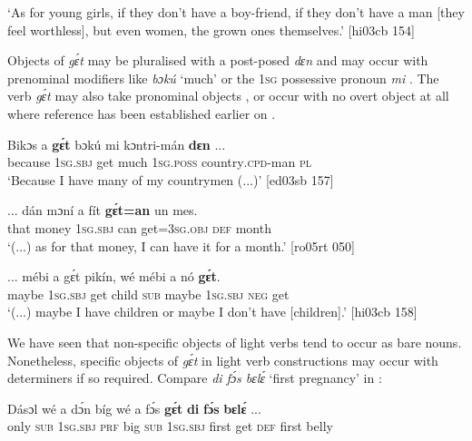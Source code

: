 \glt ‘As for young girls, if they don’t have a boy-friend, if they don’t have a man
[they feel worthless], but even women, the grown ones themselves.’ [hi03cb 154]
\z

Objects of \textit{gɛ́t} may be pluralised with a post-posed \textit{dɛn}  and may occur with prenominal modifiers like \textit{bɔkú} ‘much’ or the \textsc{1sg} possessive pronoun \textit{mi} . The verb \textit{gɛ́t} may also take pronominal objects , or occur with no overt object at all where reference has been established earlier on .


\ea%
    \label{ex:key:1160}
    \gll Bikɔs  a    \textbf{gɛ́t}  bɔkú  mi    kɔntri-mán    \textbf{dɛn}  \op...\cp{}\\
because  \textsc{1sg.sbj}  get  much  \textsc{1sg.poss}  country\textsc{.cpd}{}-man  \textsc{pl}\\

\glt ‘Because I have many of my countrymen (...)’ [ed03sb 157]
\z


\ea%
    \label{ex:key:1161}
    \gll \op...\cp{}  dán  mɔní  a    fít  \textbf{gɛ́t=an}    un  mes.\\
  {} that  money  \textsc{1sg.sbj}  can  get=\textsc{3sg.obj}  \textsc{def}  month\\

\glt ‘(...) as for that money, I can have it for a month.’ [ro05rt 050]
\z


\ea%
    \label{ex:key:1162}
    \gll \op...\cp{}  mébi  a    gɛ́t  pikín,  wé  mébi  a    nó  \textbf{gɛ́t}.\\
  {} maybe  \textsc{1sg.sbj}  get  child  \textsc{sub}  maybe  \textsc{1sg.sbj}  \textsc{neg}  get\\

\glt ‘(...) maybe I have children or maybe I don’t have [children].’ [hi03cb 158]
\z

We have seen that non-specific objects of light verbs tend to occur as bare nouns. Nonetheless, specific objects of \textit{gɛ́t} in light verb constructions may occur with determiners if so required. Compare \textit{di fɔ́s bɛlɛ́} ‘first pregnancy’ in :


\ea%
    \label{ex:key:1163}
    \gll Dásɔl  wé  a    dɔ́n  bíg  wé  a    fɔ́s  \textbf{gɛ́t}
\textbf{di}  \textbf{fɔ́s}  \textbf{bɛlɛ́}  \op...\cp{}\\
only    \textsc{sub}  \textsc{1sg.sbj}  \textsc{prf}  big  \textsc{sub}  \textsc{1sg.sbj}  first  get
\textsc{def}  first  belly\\

